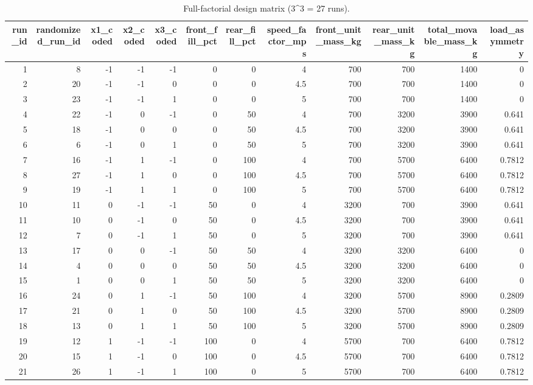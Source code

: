 \begin{table}
\caption{Full-factorial design matrix (3^3 = 27 runs).}
\label{tab:table03_design}
\begin{tabular}{rrrrrrrrrrrr}
\toprule
run\_id & randomized\_run\_id & x1\_coded & x2\_coded & x3\_coded & front\_fill\_pct & rear\_fill\_pct & speed\_factor\_mps & front\_unit\_mass\_kg & rear\_unit\_mass\_kg & total\_movable\_mass\_kg & load\_asymmetry \\
\midrule
1 & 8 & -1 & -1 & -1 & 0 & 0 & 4 & 700 & 700 & 1400 & 0 \\
2 & 20 & -1 & -1 & 0 & 0 & 0 & 4.5 & 700 & 700 & 1400 & 0 \\
3 & 23 & -1 & -1 & 1 & 0 & 0 & 5 & 700 & 700 & 1400 & 0 \\
4 & 22 & -1 & 0 & -1 & 0 & 50 & 4 & 700 & 3200 & 3900 & 0.641 \\
5 & 18 & -1 & 0 & 0 & 0 & 50 & 4.5 & 700 & 3200 & 3900 & 0.641 \\
6 & 6 & -1 & 0 & 1 & 0 & 50 & 5 & 700 & 3200 & 3900 & 0.641 \\
7 & 16 & -1 & 1 & -1 & 0 & 100 & 4 & 700 & 5700 & 6400 & 0.7812 \\
8 & 27 & -1 & 1 & 0 & 0 & 100 & 4.5 & 700 & 5700 & 6400 & 0.7812 \\
9 & 19 & -1 & 1 & 1 & 0 & 100 & 5 & 700 & 5700 & 6400 & 0.7812 \\
10 & 11 & 0 & -1 & -1 & 50 & 0 & 4 & 3200 & 700 & 3900 & 0.641 \\
11 & 10 & 0 & -1 & 0 & 50 & 0 & 4.5 & 3200 & 700 & 3900 & 0.641 \\
12 & 7 & 0 & -1 & 1 & 50 & 0 & 5 & 3200 & 700 & 3900 & 0.641 \\
13 & 17 & 0 & 0 & -1 & 50 & 50 & 4 & 3200 & 3200 & 6400 & 0 \\
14 & 4 & 0 & 0 & 0 & 50 & 50 & 4.5 & 3200 & 3200 & 6400 & 0 \\
15 & 1 & 0 & 0 & 1 & 50 & 50 & 5 & 3200 & 3200 & 6400 & 0 \\
16 & 24 & 0 & 1 & -1 & 50 & 100 & 4 & 3200 & 5700 & 8900 & 0.2809 \\
17 & 21 & 0 & 1 & 0 & 50 & 100 & 4.5 & 3200 & 5700 & 8900 & 0.2809 \\
18 & 13 & 0 & 1 & 1 & 50 & 100 & 5 & 3200 & 5700 & 8900 & 0.2809 \\
19 & 12 & 1 & -1 & -1 & 100 & 0 & 4 & 5700 & 700 & 6400 & 0.7812 \\
20 & 15 & 1 & -1 & 0 & 100 & 0 & 4.5 & 5700 & 700 & 6400 & 0.7812 \\
21 & 26 & 1 & -1 & 1 & 100 & 0 & 5 & 5700 & 700 & 6400 & 0.7812 \\

\end{tabular}
\end{table}
